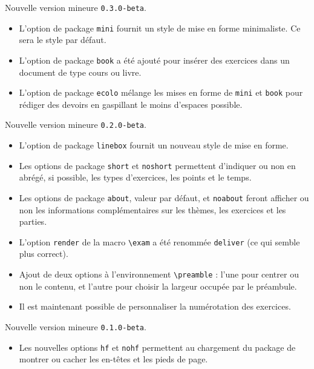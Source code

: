 \documentclass[12pt,a4paper]{scrartcl}
\begin{document}
\begin{description}[leftmargin=1em]
    \item[2017-12-02] Nouvelle version mineure \verb+0.3.0-beta+.
    \begin{itemize}
        \item L'option de package \verb+mini+ fournit un style de mise en forme minimaliste. Ce sera le style par défaut.

        \item L'option de package \verb+book+ a été ajouté pour insérer des exercices dans un document de type cours ou livre.

        \item L'option de package \verb+ecolo+ mélange les mises en forme de \verb+mini+ et \verb+book+ pour rédiger des devoirs en gaspillant le moins d'espaces possible.
    \end{itemize}


    \item[2017-11-28] Nouvelle version mineure \verb+0.2.0-beta+.
    \begin{itemize}
        \item L'option de package \verb+linebox+ fournit un nouveau style de mise en forme.

        \item Les options de package \verb+short+ et \verb+noshort+ permettent d'indiquer ou non en abrégé, si possible, les types d'exercices, les points et le temps.

        \item Les options de package \verb+about+, valeur par défaut, et \verb+noabout+ feront afficher ou non les informations complémentaires sur les thèmes, les exercices et les parties.

        \item L'option \verb+render+ de la macro \verb+\exam+ a été renommée \verb+deliver+ (ce qui semble plus correct).

        \item Ajout de deux options à l'environnement \verb+\preamble+ : l'une pour centrer ou non le contenu, et l'autre pour choisir la largeur occupée par le préambule.

        \item Il est maintenant possible de personnaliser la numérotation des exercices.
    \end{itemize}


    \item[2017-11-12] Nouvelle version mineure \verb+0.1.0-beta+.
    \begin{itemize}
        \item Les nouvelles options \verb+hf+ et \verb+nohf+ permettent au chargement du package de montrer ou cacher les en-têtes et les pieds de page.


\end{itemize}
\end{description}
\end{document}
